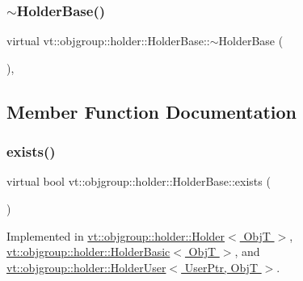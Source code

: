 \subsubsection{\texorpdfstring{$\sim$\+Holder\+Base()}{~HolderBase()}}
{\footnotesize\ttfamily virtual vt\+::objgroup\+::holder\+::\+Holder\+Base\+::$\sim$\+Holder\+Base (\begin{DoxyParamCaption}{ }\end{DoxyParamCaption})\hspace{0.3cm}{\ttfamily [virtual]}, {\ttfamily [default]}}



\subsection{Member Function Documentation}
\mbox{\label{structvt_1_1objgroup_1_1holder_1_1_holder_base_afeebbe358baf0b2bfea57f52807be564}} 
\subsubsection{\texorpdfstring{exists()}{exists()}}
{\footnotesize\ttfamily virtual bool vt\+::objgroup\+::holder\+::\+Holder\+Base\+::exists (\begin{DoxyParamCaption}{ }\end{DoxyParamCaption})\hspace{0.3cm}{\ttfamily [pure virtual]}}



Implemented in \hyperlink{structvt_1_1objgroup_1_1holder_1_1_holder_a0c18e5f4287e37e6a89a72df90e68273}{vt\+::objgroup\+::holder\+::\+Holder$<$ Obj\+T $>$}, \hyperlink{structvt_1_1objgroup_1_1holder_1_1_holder_basic_ab52459a275afea84f6650d206fe5b3dc}{vt\+::objgroup\+::holder\+::\+Holder\+Basic$<$ Obj\+T $>$}, and \hyperlink{structvt_1_1objgroup_1_1holder_1_1_holder_user_abba92cc4a99e045b64a1865fe1477fb2}{vt\+::objgroup\+::holder\+::\+Holder\+User$<$ User\+Ptr, Obj\+T $>$}.

\mbox{\label{structvt_1_1objgroup_1_1holder_1_1_holder_base_a0b40d32b476b94586468abb5ae9a53a6}} 
